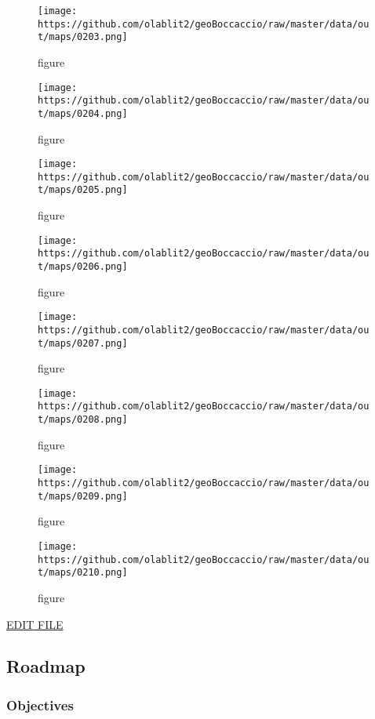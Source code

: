 \begin{figure}
\centering
\texttt{[image: https://github.com/olablit2/geoBoccaccio/raw/master/data/out/maps/0203.png]}
\caption{figure}
\end{figure}

\begin{figure}
\centering
\texttt{[image: https://github.com/olablit2/geoBoccaccio/raw/master/data/out/maps/0204.png]}
\caption{figure}
\end{figure}

\begin{figure}
\centering
\texttt{[image: https://github.com/olablit2/geoBoccaccio/raw/master/data/out/maps/0205.png]}
\caption{figure}
\end{figure}

\begin{figure}
\centering
\texttt{[image: https://github.com/olablit2/geoBoccaccio/raw/master/data/out/maps/0206.png]}
\caption{figure}
\end{figure}

\begin{figure}
\centering
\texttt{[image: https://github.com/olablit2/geoBoccaccio/raw/master/data/out/maps/0207.png]}
\caption{figure}
\end{figure}

\begin{figure}
\centering
\texttt{[image: https://github.com/olablit2/geoBoccaccio/raw/master/data/out/maps/0208.png]}
\caption{figure}
\end{figure}

\begin{figure}
\centering
\texttt{[image: https://github.com/olablit2/geoBoccaccio/raw/master/data/out/maps/0209.png]}
\caption{figure}
\end{figure}

\begin{figure}
\centering
\texttt{[image: https://github.com/olablit2/geoBoccaccio/raw/master/data/out/maps/0210.png]}
\caption{figure}
\end{figure}

\href{https://github.com/olablit2/geoBoccaccio/edit/master/docs/2018-article/99-roadmap.md}{EDIT
FILE}

\subsection{Roadmap}\label{roadmap}

\subsubsection{Objectives}\label{objectives}

